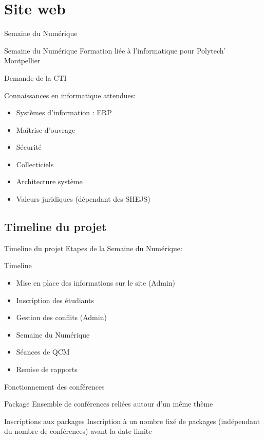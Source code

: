 \section{Site web}

\begin{frame}{Semaine du Numérique}
    \begin{block}{Semaine du Numérique}
    Formation liée à l'informatique pour Polytech' Montpellier

    Demande de la CTI

    Connaissances en informatique attendues:
    \begin{itemize}
    \item Systèmes d’information : ERP
    \item Maîtrise d’ouvrage
    \item Sécurité
    \item Collecticiels
    \item Architecture système
    \item Valeurs juridiques (dépendant des SHEJS)
    \end{itemize}
    \end{block}
\end{frame}

\subsection{Timeline du projet}
\begin{frame}{Timeline du projet}
    Etapes de la Semaine du Numérique:
    \begin{block}{Timeline}
    \begin{itemize}
    \item Mise en place des informations sur le site (Admin)
    \item Inscription des étudiants
    \item Gestion des conflits (Admin)
    \item Semaine du Numérique
    \item Séances de QCM
    \item Remise de rapports
    \end{itemize}
    \end{block}
\end{frame}

\begin{frame}{Fonctionnement des conférences}
    \begin{block}{Package}
    Ensemble de conférences reliées autour d'un même thème
    \end{block}

    \begin{block}{Inscriptions aux packages}
    Inscription à un nombre fixé de packages (indépendant du nombre de conférences) avant la date limite
    \end{block}
\end{frame}

